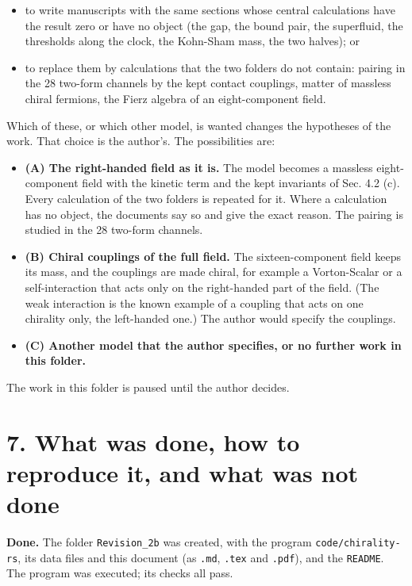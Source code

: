 \documentclass[
  10pt,
]{article}
\providecommand{\tightlist}{%
  \setlength{\itemsep}{0pt}\setlength{\parskip}{0pt}}
\begin{document}
\begin{itemize}
\tightlist
\item
  to write manuscripts with the same sections whose central calculations
  have the result zero or have no object (the gap, the bound pair, the
  superfluid, the thresholds along the clock, the Kohn-Sham mass, the
  two halves); or
\item
  to replace them by calculations that the two folders do not contain:
  pairing in the 28 two-form channels by the kept contact couplings,
  matter of massless chiral fermions, the Fierz algebra of an
  eight-component field.
\end{itemize}

Which of these, or which other model, is wanted changes the hypotheses
of the work. That choice is the author's. The possibilities are:

\begin{itemize}
\tightlist
\item
  \textbf{(A) The right-handed field as it is.} The model becomes a
  massless eight-component field with the kinetic term and the kept
  invariants of Sec. 4.2 (c). Every calculation of the two folders is
  repeated for it. Where a calculation has no object, the documents say
  so and give the exact reason. The pairing is studied in the 28
  two-form channels.
\item
  \textbf{(B) Chiral couplings of the full field.} The sixteen-component
  field keeps its mass, and the couplings are made chiral, for example a
  Vorton-Scalar or a self-interaction that acts only on the right-handed
  part of the field. (The weak interaction is the known example of a
  coupling that acts on one chirality only, the left-handed one.) The
  author would specify the couplings.
\item
  \textbf{(C) Another model that the author specifies, or no further
  work in this folder.}
\end{itemize}

The work in this folder is paused until the author decides.

\hypertarget{what-was-done-how-to-reproduce-it-and-what-was-not-done}{%
\section{7. What was done, how to reproduce it, and what was not
done}\label{what-was-done-how-to-reproduce-it-and-what-was-not-done}}

\textbf{Done.} The folder \texttt{Revision\_2b} was created, with the
program \texttt{code/chirality-rs}, its data files and this document (as
\texttt{.md}, \texttt{.tex} and \texttt{.pdf}), and the \texttt{README}.
The program was executed; its checks all pass.
\end{document}

